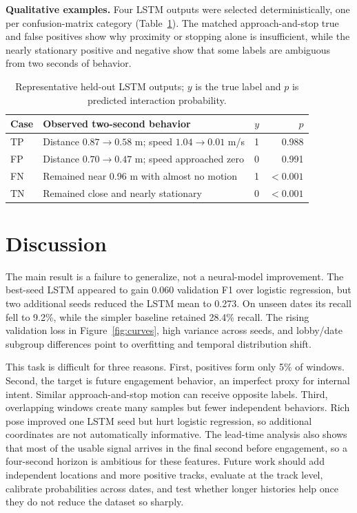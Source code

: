 \documentclass[final]{article}
\begin{document}
\textbf{Qualitative examples.} Four LSTM outputs were selected deterministically, one per confusion-matrix category (Table~\ref{tab:examples}). The matched approach-and-stop true and false positives show why proximity or stopping alone is insufficient, while the nearly stationary positive and negative show that some labels are ambiguous from two seconds of behavior.

\begin{table}[!ht]
  \centering
  \scriptsize
  \caption{Representative held-out LSTM outputs; $y$ is the true label and $p$ is predicted interaction probability.}
  \label{tab:examples}
  \begin{tabularx}{\linewidth}{lXrr}
    \toprule
    Case & Observed two-second behavior & $y$ & $p$ \\
    \midrule
    TP & Distance $0.87\!\to\!0.58$ m; speed $1.04\!\to\!0.01$ m/s & 1 & 0.988 \\
    FP & Distance $0.70\!\to\!0.47$ m; speed approached zero & 0 & 0.991 \\
    FN & Remained near 0.96 m with almost no motion & 1 & $<0.001$ \\
    TN & Remained close and nearly stationary & 0 & $<0.001$ \\
    \bottomrule
  \end{tabularx}
\end{table}

\section*{Discussion}

The main result is a failure to generalize, not a neural-model improvement. The best-seed LSTM appeared to gain 0.060 validation F1 over logistic regression, but two additional seeds reduced the LSTM mean to 0.273. On unseen dates its recall fell to 9.2\%, while the simpler baseline retained 28.4\% recall. The rising validation loss in Figure~\ref{fig:curves}, high variance across seeds, and lobby/date subgroup differences point to overfitting and temporal distribution shift.

This task is difficult for three reasons. First, positives form only 5\% of windows. Second, the target is future engagement behavior, an imperfect proxy for internal intent. Similar approach-and-stop motion can receive opposite labels. Third, overlapping windows create many samples but fewer independent behaviors. Rich pose improved one LSTM seed but hurt logistic regression, so additional coordinates are not automatically informative. The lead-time analysis also shows that most of the usable signal arrives in the final second before engagement, so a four-second horizon is ambitious for these features. Future work should add independent locations and more positive tracks, evaluate at the track level, calibrate probabilities across dates, and test whether longer histories help once they do not reduce the dataset so sharply.
\end{document}
